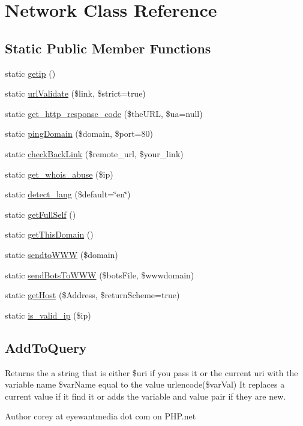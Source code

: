 \hypertarget{class_network}{\section{Network Class Reference}
\label{class_network}
}
\subsection*{Static Public Member Functions}
\begin{DoxyCompactItemize}
\item 
static \hyperlink{class_network_af3fdd43c8a859ddccce91ba8a5e3346c}{getip} ()
\item 
static \hyperlink{class_network_a6c04bacdc24d4b3d2ed7c9ea4a29210f}{url\-Validate} (\$link, \$strict=true)
\item 
static \hyperlink{class_network_ae99ae2dab82ab327e8b6d938c261d672}{get\-\_\-http\-\_\-response\-\_\-code} (\$the\-U\-R\-L, \$ua=null)
\item 
static \hyperlink{class_network_a3e56c11338f02530cb36a57c153f80f2}{ping\-Domain} (\$domain, \$port=80)
\item 
static \hyperlink{class_network_a01edf5e6ea88a99a0997a17336842c60}{check\-Back\-Link} (\$remote\-\_\-url, \$your\-\_\-link)
\item 
static \hyperlink{class_network_af4640ff629ddc87eff9b904a13ace30e}{get\-\_\-whois\-\_\-abuse} (\$ip)
\item 
static \hyperlink{class_network_a6ba7727d77c0f2a9e722716d6c012e3d}{detect\-\_\-lang} (\$default=\char`\"{}en\char`\"{})
\item 
static \hyperlink{class_network_a711272266c8ce0089919059fb05ea42b}{get\-Full\-Self} ()
\item 
static \hyperlink{class_network_a090adb44a65abba5099270e1a41e14a9}{get\-This\-Domain} ()
\item 
static \hyperlink{class_network_adef9087d8bcbbb414c4b74a5f6e769fe}{sendto\-W\-W\-W} (\$domain)
\item 
static \hyperlink{class_network_a87c49a4ee57ae0671cee0a2314be0053}{send\-Bots\-To\-W\-W\-W} (\$bots\-File, \$wwwdomain)
\item 
static \hyperlink{class_network_ab835c3be436302d527c0041f89b3e4f6}{get\-Host} (\$Address, \$return\-Scheme=true)
\item 
static \hyperlink{class_network_af11831fa6be865c1221fb0262204a0ec}{is\-\_\-valid\-\_\-ip} (\$ip)
\end{DoxyCompactItemize}
\subsection*{Add\-To\-Query}
\label{_amgrp470e8b3abfc0b6b72e16f865369d0267}%
 Returns the a string that is either \$uri if you pass it or the current uri with the variable name \$var\-Name equal to the value urlencode(\$var\-Val) It replaces a current value if it find it or adds the variable and value pair if they are new. \begin{DoxyAuthor}{Author}
corey at eyewantmedia dot com on P\-H\-P.\-net
\end{DoxyAuthor}

